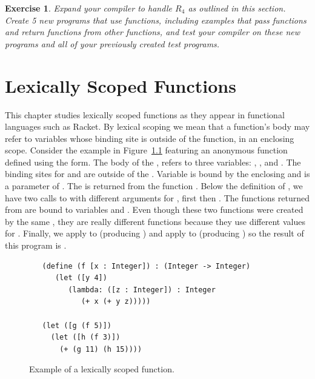 \documentclass[11pt]{book}
\newtheorem{exercise}[theorem]{Exercise}
\begin{document}
\begin{exercise}\normalfont
Expand your compiler to handle $R_4$ as outlined in this section.
Create 5 new programs that use functions, including examples that pass
functions and return functions from other functions, and test your
compiler on these new programs and all of your previously created test
programs.
\end{exercise}


\chapter{Lexically Scoped Functions}
\label{ch:lambdas}

This chapter studies lexically scoped functions as they appear in
functional languages such as Racket. By lexical scoping we mean that a
function's body may refer to variables whose binding site is outside
of the function, in an enclosing scope.
%
Consider the example in Figure~\ref{fig:lexical-scoping} featuring an
anonymous function defined using the  form.  The body of
the , refers to three variables: , , and
. The binding sites for  and  are outside of
the . Variable  is bound by the enclosing
 and  is a parameter of . The  is
returned from the function . Below the definition of ,
we have two calls to  with different arguments for ,
first  then . The functions returned from  are
bound to variables  and . Even though these two
functions were created by the same , they are really
different functions because they use different values for
. Finally, we apply  to  (producing
) and apply  to  (producing ) so
the result of this program is .

\begin{figure}[btp]
\begin{lstlisting}
   (define (f [x : Integer]) : (Integer -> Integer)
      (let ([y 4])
         (lambda: ([z : Integer]) : Integer
            (+ x (+ y z)))))

   (let ([g (f 5)])
     (let ([h (f 3)])
       (+ (g 11) (h 15))))
\end{lstlisting}
\caption{Example of a lexically scoped function.}
\label{fig:lexical-scoping}
\end{figure}
\end{document}
